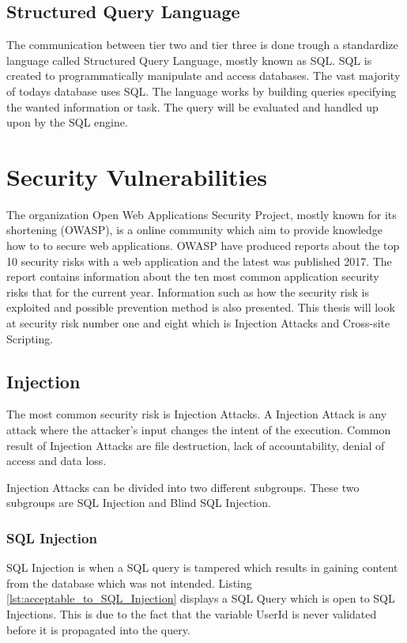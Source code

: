 \subsection{Structured Query Language}
The communication between tier two and tier three is done trough a standardize language called Structured Query Language, mostly known as SQL. SQL is created to programmatically manipulate and access databases. The vast majority of todays database uses SQL. The language works by building queries specifying the wanted information or task. The query will be evaluated and handled up upon by the SQL engine. \parencite{DarieCristian2003TPGt}


\section{Security Vulnerabilities}
The organization Open Web Applications Security Project, mostly known for its shortening (OWASP), is a online community which aim to provide knowledge how to to secure web applications. \parencite{OpenWebApplicationSecurityProject} OWASP have produced reports about the top 10 security risks with a web application and the latest was published 2017. The report contains information about the ten most common application security risks that for the current year. Information such as how the security risk is exploited and possible prevention method is also presented. This thesis will look at security risk number one and eight which is Injection Attacks and Cross-site Scripting. \parencite{OWASP2017}


\subsection{Injection}
The most common security risk is Injection Attacks. \parencite{OWASP2017} A Injection Attack is any attack where the attacker's input changes the intent of the execution. Common result of Injection Attacks are file destruction, lack of accountability, denial of access and data loss. \parencite{Secure_Web}

Injection Attacks can be divided into two different subgroups. These two subgroups are SQL Injection and Blind SQL Injection. \parencite{Secure_Web}


\subsubsection{SQL Injection}
SQL Injection is when a SQL query is tampered which results in gaining content from the database which was not intended. Listing \ref{lst:acceptable_to_SQL_Injection} displays a SQL Query which is open to SQL Injections. This is due to the fact that the variable UserId is never validated before it is propagated into the query. \parencite{JustinClarke-Salt2009SIAa, Secure_Web} 

